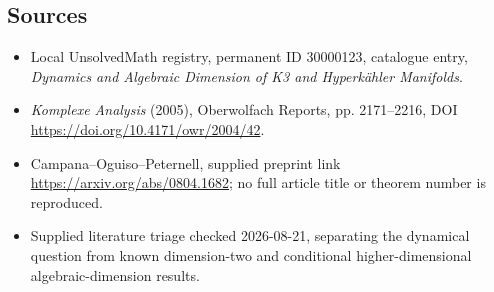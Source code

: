 \documentclass[11pt]{article}
\begin{document}
\subsection{Sources}
\begin{itemize}
\item Local UnsolvedMath registry, permanent ID 30000123, catalogue entry, \emph{Dynamics and Algebraic Dimension of K3 and Hyperk\"ahler Manifolds}.
\item \emph{Komplexe Analysis} (2005), Oberwolfach Reports, pp. 2171--2216, DOI \url{https://doi.org/10.4171/owr/2004/42}.
\item Campana--Oguiso--Peternell, supplied preprint link \url{https://arxiv.org/abs/0804.1682}; no full article title or theorem number is reproduced.
\item Supplied literature triage checked 2026-08-21, separating the dynamical question from known dimension-two and conditional higher-dimensional algebraic-dimension results.
\end{itemize}
\end{document}
